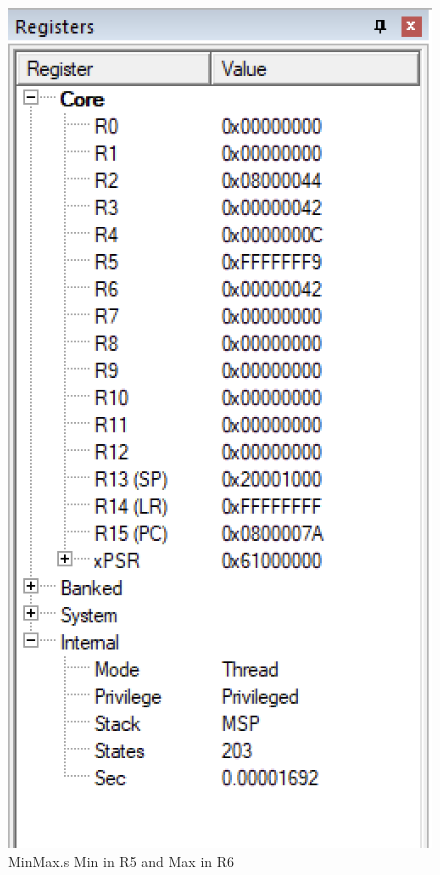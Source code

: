 \documentclass{article}
\begin{document}
\begin{figure}
\centering
\caption{MinMax.s Min in R5 and Max in R6}
\includegraphics{../../Images/minMax_register_vals.png}
\end{figure}
\end{document}
